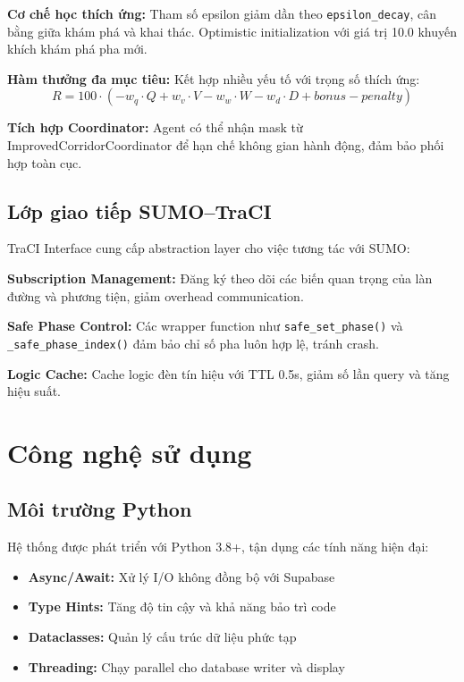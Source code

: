 \textbf{Cơ chế học thích ứng:} Tham số epsilon giảm dần theo \texttt{epsilon\_decay}, cân bằng giữa khám phá và khai thác. Optimistic initialization với giá trị 10.0 khuyến khích khám phá pha mới.

\textbf{Hàm thưởng đa mục tiêu:} Kết hợp nhiều yếu tố với trọng số thích ứng:
\[
R = 100 \cdot (-w_q \cdot Q + w_v \cdot V - w_w \cdot W - w_d \cdot D + bonus - penalty)
\]

\textbf{Tích hợp Coordinator:} Agent có thể nhận mask từ ImprovedCorridorCoordinator để hạn chế không gian hành động, đảm bảo phối hợp toàn cục.

\subsection{Lớp giao tiếp SUMO--TraCI}

TraCI Interface cung cấp abstraction layer cho việc tương tác với SUMO:

\textbf{Subscription Management:} Đăng ký theo dõi các biến quan trọng của làn đường và phương tiện, giảm overhead communication.

\textbf{Safe Phase Control:} Các wrapper function như \texttt{safe\_set\_phase()} và \texttt{\_safe\_phase\_index()} đảm bảo chỉ số pha luôn hợp lệ, tránh crash.

\textbf{Logic Cache:} Cache logic đèn tín hiệu với TTL 0.5s, giảm số lần query và tăng hiệu suất.

\section{Công nghệ sử dụng}

\subsection{Môi trường Python}

Hệ thống được phát triển với Python 3.8+, tận dụng các tính năng hiện đại:

\begin{itemize}
    \item \textbf{Async/Await:} Xử lý I/O không đồng bộ với Supabase
    \item \textbf{Type Hints:} Tăng độ tin cậy và khả năng bảo trì code
    \item \textbf{Dataclasses:} Quản lý cấu trúc dữ liệu phức tạp
    \item \textbf{Threading:} Chạy parallel cho database writer và display
\end{itemize}

